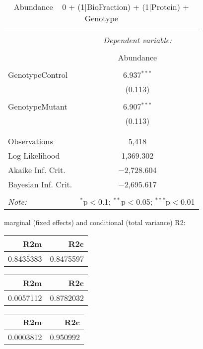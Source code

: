 \documentclass[11pt]{report}
\begin{document}
\begin{table}[!htbp] \centering 
  \caption{Abundance ~ 0 + (1|BioFraction) + (1|Protein) + Genotype} 
  \label{} 
\begin{tabular}{@{\extracolsep{5pt}}lc} 
\\[-1.8ex]\hline 
\hline \\[-1.8ex] 
 & \multicolumn{1}{c}{\textit{Dependent variable:}} \\ 
\cline{2-2} 
\\[-1.8ex] & Abundance \\ 
\hline \\[-1.8ex] 
 GenotypeControl & 6.937$^{***}$ \\ 
  & (0.113) \\ 
  & \\ 
 GenotypeMutant & 6.907$^{***}$ \\ 
  & (0.113) \\ 
  & \\ 
\hline \\[-1.8ex] 
Observations & 5,418 \\ 
Log Likelihood & 1,369.302 \\ 
Akaike Inf. Crit. & $-$2,728.604 \\ 
Bayesian Inf. Crit. & $-$2,695.617 \\ 
\hline 
\hline \\[-1.8ex] 
\textit{Note:}  & \multicolumn{1}{r}{$^{*}$p$<$0.1; $^{**}$p$<$0.05; $^{***}$p$<$0.01} \\ 
\end{tabular} 
\end{table} 
marginal (fixed effects) and conditional (total variance) R2:

\begin{tabular}{r|r}
\hline
R2m & R2c\\
\hline
0.8435383 & 0.8475597\\
\hline
\end{tabular}

\begin{tabular}{r|r}
\hline
R2m & R2c\\
\hline
0.0057112 & 0.8782032\\
\hline
\end{tabular}

\begin{tabular}{r|r}
\hline
R2m & R2c\\
\hline
0.0003812 & 0.950992\\
\hline
\end{tabular}
\end{document}
